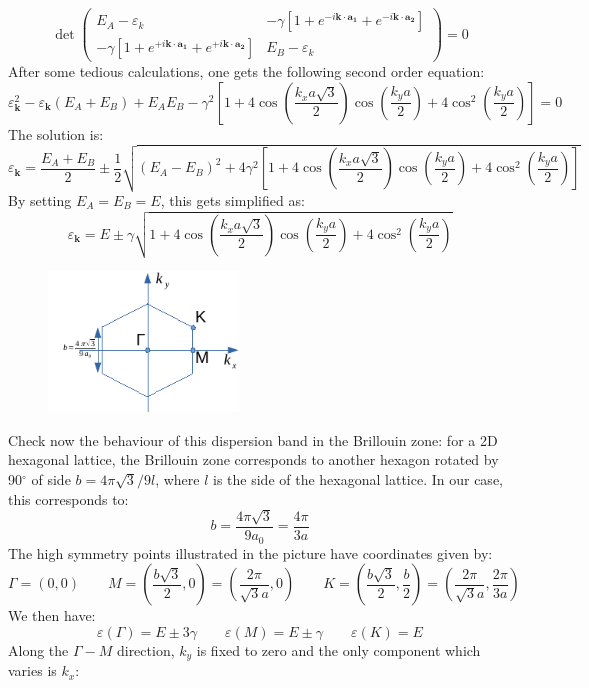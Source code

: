 \documentclass[10.75pt,a4paper,openright,bottom=2cm]{article}
\renewcommand{\Vec}[1]{\boldsymbol{#1}}
\begin{document}
\[
\det\left(\begin{array}{cc}
    E_A-\varepsilon_k & -\gamma[1+e^{-i\Vec{k}\cdot\Vec{a_1}}+e^{-i\Vec{k}\cdot\Vec{a_2}}]\\
    -\gamma[1+e^{+i\Vec{k}\cdot\Vec{a_1}}+e^{+i\Vec{k}\cdot\Vec{a_2}}] & E_B-\varepsilon_k
\end{array}\right)=0
\]
After some tedious calculations, one gets the following second order equation:
\[
\varepsilon_{\Vec{k}}^2-\varepsilon_{\Vec{k}}(E_A+E_B)+E_AE_B-\gamma^2\left[1+4\cos\left(\frac{k_xa\sqrt{3}}{2}\right)\cos\left(\frac{k_ya}{2}\right)+4\cos^2\left(\frac{k_ya}{2}\right)\right]=0
\]
The solution is:
\begin{equation}
\label{bandform}
\varepsilon_{\Vec{k}}=\frac{E_A+E_B}{2}\pm\frac{1}{2}\sqrt{(E_A-E_B)^2+4\gamma^2\left[1+4\cos\left(\frac{k_xa\sqrt{3}}{2}\right)\cos\left(\frac{k_ya}{2}\right)+4\cos^2\left(\frac{k_ya}{2}\right)\right]}
\end{equation}
By setting $E_A=E_B=E$, this gets simplified as:
\[
\varepsilon_{\Vec{k}}=E\pm\gamma\sqrt{1+4\cos\left(\frac{k_xa\sqrt{3}}{2}\right)\cos\left(\frac{k_ya}{2}\right)+4\cos^2\left(\frac{k_ya}{2}\right)}
\]
\begin{figure}
\includegraphics[width=0.45\textwidth]{brillouinzone.pdf}
\end{figure}
Check now the behaviour of this dispersion band in the  Brillouin zone: for a 2D hexagonal lattice, the  Brillouin zone corresponds to another hexagon rotated by 90$^\circ$ of side $b=4\pi\sqrt{3}/9l$, where $l$ is the side of the hexagonal lattice. In our case, this corresponds to:
\[
b=\frac{4\pi\sqrt{3}}{9a_0}=\frac{4\pi}{3a}
\]
The high symmetry points illustrated in the picture have coordinates given by:
\[
\Gamma=(0,0) \qquad M=\left(\frac{b\sqrt{3}}{2},0\right)=\left(\frac{2\pi}{\sqrt{3}a},0\right) \qquad K=\left(\frac{b\sqrt{3}}{2},\frac{b}{2}\right)=\left(\frac{2\pi}{\sqrt{3}a},\frac{2\pi}{3a}\right)
\]
We then have:
\[
\varepsilon(\Gamma)=E\pm3\gamma \qquad \varepsilon(M)=E\pm\gamma \qquad \varepsilon(K)=E
\]
Along the $\Gamma-M$ direction, $k_y$ is fixed to zero and the only component which varies is $k_x$:
\end{document}

